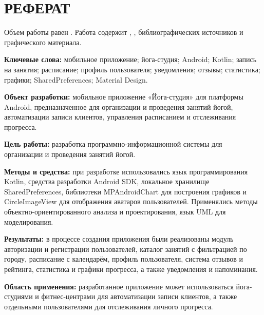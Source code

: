 \section*{РЕФЕРАТ}

Объем работы равен . 
Работа содержит , 
,  
библиографических источников и  
графического материала.

\textbf{Ключевые слова:} 
мобильное приложение; йога-студия; Android; Kotlin; запись на занятия; 
расписание; профиль пользователя; уведомления; отзывы; статистика; 
графики; SharedPreferences; Material Design.

\textbf{Объект разработки:} 
мобильное приложение «Йога-студия» для платформы Android, 
предназначенное для организации и проведения занятий йогой, 
автоматизации записи клиентов, управления расписанием и 
отслеживания прогресса.

\textbf{Цель работы:} 
разработка программно-информационной системы для организации 
и проведения занятий йогой.

\textbf{Методы и средства:} 
при разработке использовались язык программирования Kotlin, 
средства разработки Android SDK, локальное хранилище SharedPreferences, 
библиотеки MPAndroidChart для построения графиков и CircleImageView 
для отображения аватаров пользователей. Применялись методы 
объектно-ориентированного анализа и проектирования, язык UML 
для моделирования.

\textbf{Результаты:} 
в процессе создания приложения были реализованы модуль авторизации 
и регистрации пользователей, каталог занятий с фильтрацией по городу, 
расписание с календарём, профиль пользователя, система отзывов и 
рейтинга, статистика и графики прогресса, а также уведомления и 
напоминания.

\textbf{Область применения:} 
разработанное приложение может использоваться йога-студиями и 
фитнес-центрами для автоматизации записи клиентов, а также 
отдельными пользователями для отслеживания личного прогресса.